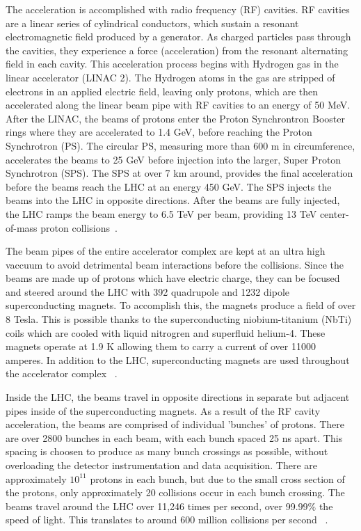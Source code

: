 The acceleration is accomplished with radio frequency (RF) cavities. RF cavities are a linear series of cylindrical conductors,
which sustain a resonant electromagnetic field produced by a generator. As 
charged particles pass through the cavities, they experience a force
(acceleration) from the resonant alternating field in each cavity. This acceleration process begins with Hydrogen gas in the linear accelerator
(LINAC 2). The Hydrogen atoms in the gas are stripped of electrons
in an applied electric field, leaving only protons, which are then accelerated
along the linear beam pipe with RF cavities to an energy of 50 MeV. After the LINAC, the beams of protons enter the Proton Synchrontron Booster rings where
they are accelerated to 1.4 GeV, before reaching the Proton
Synchrotron (PS). The circular PS, measuring more than 600 m
in circumference, accelerates the beams to 25 GeV before injection into the
larger, Super Proton Synchrotron (SPS). The SPS at over 7 km around, provides the final
acceleration before the beams reach the LHC at an energy 450 GeV. The SPS injects the beams into
the LHC in opposite directions. After the beams are fully injected, the LHC ramps the beam energy to 6.5 TeV per beam, providing 13 TeV center-of-mass proton collisions~\cite{lhc_bluebook}.

The beam pipes of the entire accelerator complex are kept at an ultra high vaccuum
to avoid detrimental beam interactions before the collisions. Since the beams are made up of protons which have electric charge,
they can be focused and steered around the LHC with 392 quadrupole and 1232 dipole superconducting magnets.
To accomplish this, the magnets produce a field of over 8 Tesla. This is possible thanks to the
superconducting niobium-titanium (NbTi) coils which are cooled with liquid nitrogren and superfluid helium-4. These
magnets operate at 1.9 K allowing them to carry a current of over 11000 amperes. In addition to
the LHC, superconducting magnets are used throughout the accelerator complex ~\cite{lhc_bluebook}.

Inside the LHC, the beams travel in opposite directions in separate but adjacent pipes inside of the superconducting magnets.
As a result of the RF cavity acceleration, the beams are comprised of individual 'bunches' of protons.
There are over 2800 bunches in each beam, with each bunch spaced 25 ns apart. This spacing is choosen to
produce as many bunch crossings as possible, without overloading
the detector instrumentation and data acquisition. There are approximately $10^{11}$ protons in each bunch, but due to the small cross section of the protons,
only approximately 20 collisions occur in each bunch crossing. The beams travel around the LHC over 11,246 times per second, over 99.99$\%$ the speed of light. 
This translates to around 600 million collisions per second ~\cite{lhc_bluebook}.

